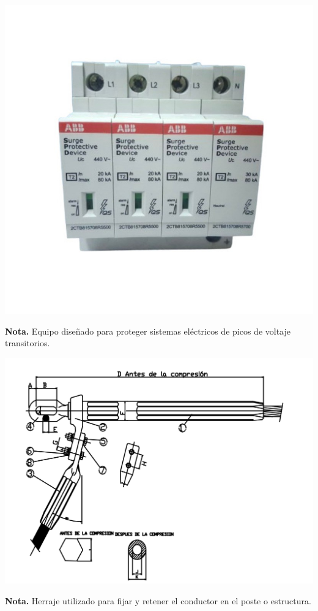 \noindent
\begin{minipage}[t]{0.48\textwidth}
    \centering
    \includegraphics[width=\linewidth]{fotosherrajes/DPS.jpg}
    \footnotesize
    \raggedright
    \textbf{Nota.} Equipo diseñado para proteger sistemas eléctricos de picos de voltaje transitorios.
\end{minipage}%
\hfill
\begin{minipage}[t]{0.48\textwidth}
    \centering
    \includegraphics[width=\linewidth]{fotosherrajes/grapa de retencion1.png}
    \footnotesize
    \raggedright
    \textbf{Nota.} Herraje utilizado para fijar y retener el conductor en el poste o estructura.
\end{minipage}

